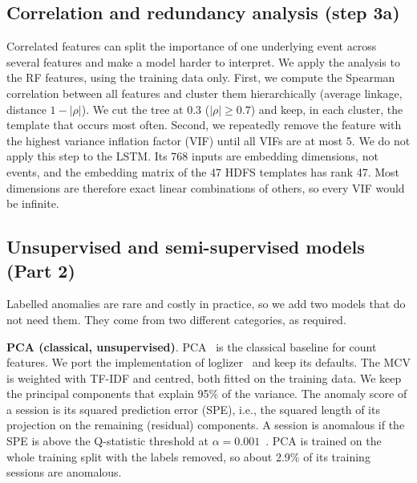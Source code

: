 \documentclass[10pt, conference]{IEEEtran}
\renewcommand{\paragraph}[1]{\noindent\textbf{#1}.}
\begin{document}
\subsection{Correlation and redundancy analysis (step 3a)}

Correlated features can split the importance of one underlying event across several features and make a model harder to interpret. We apply the analysis to the RF features, using the training data only. First, we compute the Spearman correlation between all features and cluster them hierarchically (average linkage, distance $1-|\rho|$). We cut the tree at 0.3 ($|\rho| \geq 0.7$) and keep, in each cluster, the template that occurs most often. Second, we repeatedly remove the feature with the highest variance inflation factor (VIF) until all VIFs are at most 5. We do not apply this step to the LSTM. Its 768 inputs are embedding dimensions, not events, and the embedding matrix of the 47 HDFS templates has rank 47. Most dimensions are therefore exact linear combinations of others, so every VIF would be infinite.

\subsection{Unsupervised and semi-supervised models (Part 2)}

Labelled anomalies are rare and costly in practice, so we add two models that do not need them. They come from two different categories, as required.

\paragraph{PCA (classical, unsupervised)} PCA~\cite{xu2009detecting} is the classical baseline for count features. We port the implementation of loglizer~\cite{he2016experience} and keep its defaults. The MCV is weighted with TF-IDF and centred, both fitted on the training data. We keep the principal components that explain 95\% of the variance. The anomaly score of a session is its squared prediction error (SPE), i.e., the squared length of its projection on the remaining (residual) components. A session is anomalous if the SPE is above the Q-statistic threshold at $\alpha=0.001$~\cite{jackson1979control}. PCA is trained on the whole training split with the labels removed, so about 2.9\% of its training sessions are anomalous.
\end{document}
